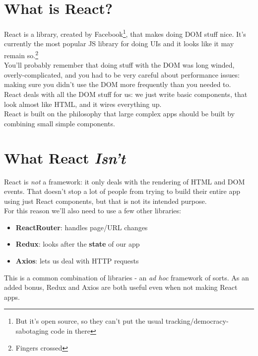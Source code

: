 \section{What is React?}


React is a library, created by Facebook\footnote{But it's open source, so they can't put the usual tracking/democracy-sabotaging code in there}, that makes doing DOM stuff nice. It's currently the most popular JS library for doing UIs and it looks like it may remain so.\footnote{Fingers crossed}
\\

You'll probably remember that doing stuff with the DOM was long winded, overly-complicated, and you had to be very careful about performance issues: making sure you didn't use the DOM more frequently than you needed to.
\\

React deals with all the DOM stuff for us: we just write basic components, that look almost like HTML, and it wires everything up.
\\

React is built on the philosophy that large complex apps should be built by combining small simple components.


\section{What React \textit{Isn't}}

React is \textit{not} a framework: it only deals with the rendering of HTML and DOM events. That doesn't stop a lot of people from trying to build their entire app using just React components, but that is not its intended purpose.
\\

For this reason we'll also need to use a few other libraries:

\begin{itemize}
    \item \textbf{ReactRouter}: handles page/URL changes
    \item \textbf{Redux}: looks after the \textbf{state} of our app
    \item \textbf{Axios}: lets us deal with HTTP requests
\end{itemize}

This is a common combination of libraries - an \textit{ad hoc} framework of sorts. As an added bonus, Redux and Axios are both useful even when not making React apps.


